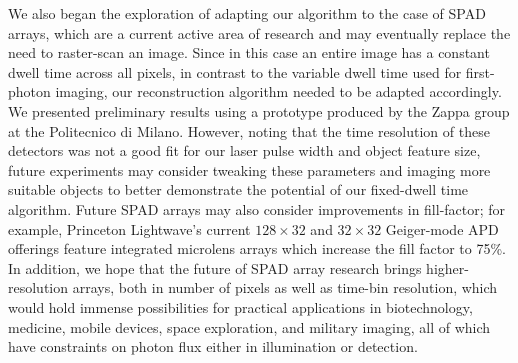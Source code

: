 We also began the exploration of adapting our algorithm to the case of SPAD arrays, which are a current active area of research and may eventually replace the need to raster-scan an image. Since in this case an entire image has a constant dwell time across all pixels, in contrast to the variable dwell time used for first-photon imaging, our reconstruction algorithm needed to be adapted accordingly. We presented preliminary results using a prototype produced by the Zappa group at the Politecnico di Milano. However, noting that the time resolution of these detectors was not a good fit for our laser pulse width and object feature size, future experiments may consider tweaking these parameters and imaging more suitable objects to better demonstrate the potential of our fixed-dwell time algorithm. Future SPAD arrays may also consider improvements in fill-factor; for example, Princeton Lightwave's current $128\times32$ and $32\times32$ Geiger-mode APD offerings \cite{princetonlightwave} feature integrated microlens arrays which increase the fill factor to 75\%. In addition, we hope that the future of SPAD array research brings higher-resolution arrays, both in number of pixels as well as time-bin resolution, which would hold immense possibilities for practical applications in biotechnology, medicine, mobile devices, space exploration, and military imaging, all of which have constraints on photon flux either in illumination or detection.

